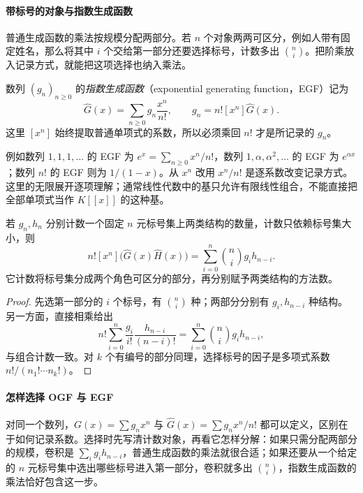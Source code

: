 \documentclass[lang=cn,a4paper,fontset=none,zihao=false,10pt,openany,twoside]{beautybook}
\numberwithin{algorithm}{chapter}
\begin{document}
\paragraph{带标号的对象与指数生成函数}
普通生成函数的乘法按规模分配两部分。若 $n$ 个对象两两可区分，例如人带有固定姓名，那么将其中 $i$ 个交给第一部分还要选择标号，计数多出 $\binom ni$。把阶乘放入记录方式，就能把这项选择也纳入乘法。
\begin{definition}[指数生成函数]\label{def:egf}
数列 $(g_n)_{n\ge0}$ 的\emph{指数生成函数}（exponential generating function，EGF）记为
\[
 \widehat G(x)=\sum_{n\ge0}g_n\frac{x^n}{n!},
 \qquad g_n=n![x^n]\widehat G(x).
\]
这里 $[x^n]$ 始终提取普通单项式的系数，所以必须乘回 $n!$ 才是所记录的 $g_n$。
\end{definition}
例如数列 $1,1,1,\ldots$ 的 EGF 为 $e^x=\sum_{n\ge0}x^n/n!$，数列 $1,\alpha,\alpha^2,\ldots$ 的 EGF 为 $e^{\alpha x}$；数列 $n!$ 的 EGF 则为 $1/(1-x)$。从 $x^n$ 改用 $x^n/n!$ 是逐系数改变记录方式。这里的无限展开逐项理解；通常线性代数中的基只允许有限线性组合，不能直接把全部单项式当作 $K[[x]]$ 的这种基。

\begin{proposition}[标号分配对应的乘法]\label{prop:egf-product}
若 $g_n,h_n$ 分别计数一个固定 $n$ 元标号集上两类结构的数量，计数只依赖标号集大小，则
\[
 n![x^n]\bigl(\widehat G(x)\widehat H(x)\bigr)
 =\sum_{i=0}^n\binom ni g_i h_{n-i}.
\]
它计数将标号集分成两个角色可区分的部分，再分别赋予两类结构的方法数。
\end{proposition}
\begin{proof}
先选第一部分的 $i$ 个标号，有 $\binom ni$ 种；两部分分别有 $g_i,h_{n-i}$ 种结构。另一方面，直接相乘给出
\[
 n!\sum_{i=0}^n\frac{g_i}{i!}\frac{h_{n-i}}{(n-i)!}
 =\sum_{i=0}^n\binom ni g_i h_{n-i},
\]
与组合计数一致。对 $k$ 个有编号的部分同理，选择标号的因子是多项式系数 $n!/(n_1!\cdots n_k!)$。
\end{proof}

\paragraph{怎样选择 OGF 与 EGF}
对同一个数列，$G(x)=\sum g_nx^n$ 与 $\widehat G(x)=\sum g_nx^n/n!$ 都可以定义，区别在于如何记录系数。选择时先写清计数对象，再看它怎样分解：如果只需分配两部分的规模，卷积是 $\sum_i g_ih_{n-i}$，普通生成函数的乘法就很合适；如果还要从一个给定的 $n$ 元标号集中选出哪些标号进入第一部分，卷积就多出 $\binom ni$，指数生成函数的乘法恰好包含这一步。
\end{document}
